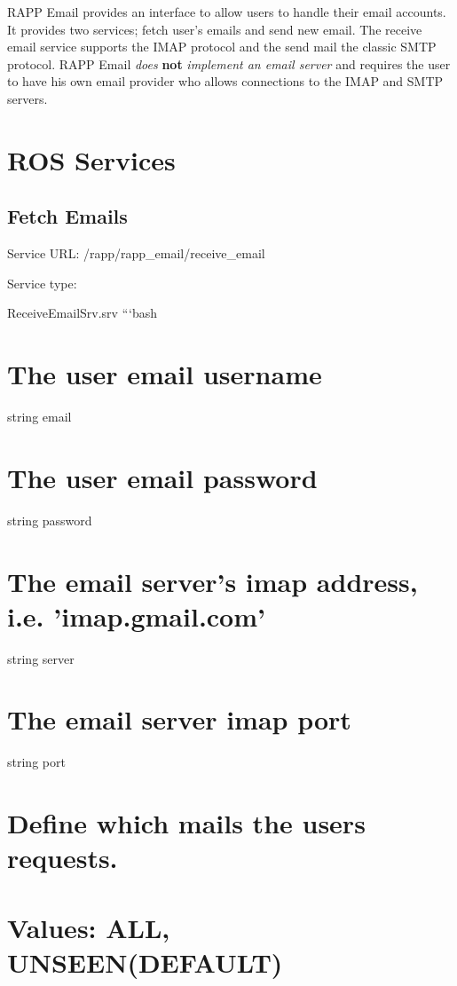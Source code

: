 R\-A\-P\-P Email provides an interface to allow users to handle their email accounts. It provides two services; fetch user's emails and send new email. The receive email service supports the I\-M\-A\-P protocol and the send mail the classic S\-M\-T\-P protocol. R\-A\-P\-P Email {\itshape does} {\bfseries not} {\itshape implement an email server} and requires the user to have his own email provider who allows connections to the I\-M\-A\-P and S\-M\-T\-P servers.

\section*{R\-O\-S Services}

\subsection*{Fetch Emails}

Service U\-R\-L\-: {\ttfamily /rapp/rapp\-\_\-email/receive\-\_\-email}

Service type\-:

Receive\-Email\-Srv.\-srv ```bash \section*{The user email username}

string email \section*{The user email password}

string password \section*{The email server's imap address, i.\-e. 'imap.\-gmail.\-com'}

string server \section*{The email server imap port}

string port

\section*{Define which mails the users requests.}

\section*{Values\-: A\-L\-L, U\-N\-S\-E\-E\-N(\-D\-E\-F\-A\-U\-L\-T)}

